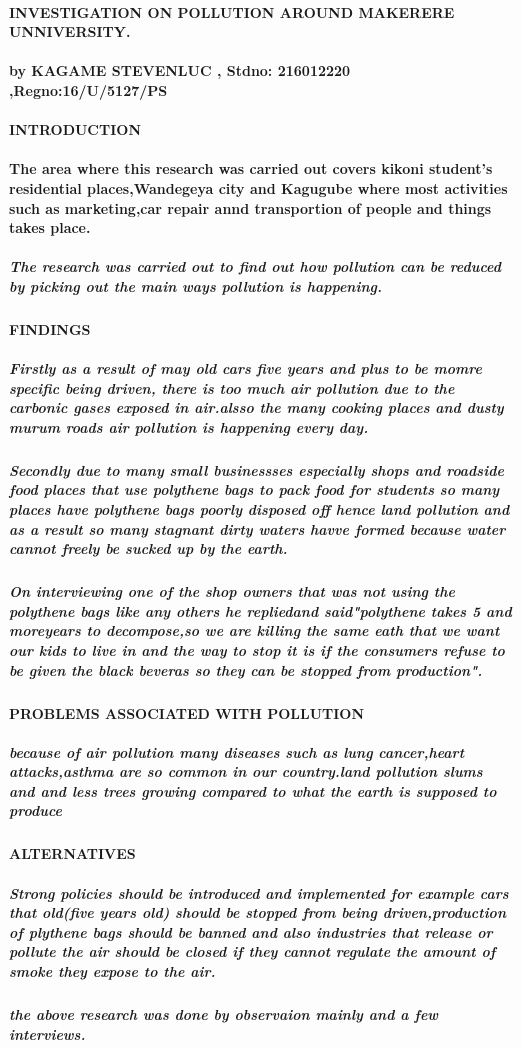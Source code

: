 \documentclass[10pt]{article}
\begin{document}
 \paragraph{ INVESTIGATION ON POLLUTION AROUND MAKERERE UNNIVERSITY. }
\paragraph{by KAGAME STEVENLUC , Stdno: 216012220 ,Regno:16/U/5127/PS}
\paragraph{INTRODUCTION}

\paragraph{The area where this research was carried out covers kikoni student's residential places,Wandegeya city and Kagugube where most activities such as marketing,car repair annd transportion of people and things takes place.}\subparagraph{The research was carried out to find out how pollution can be reduced by picking out the main ways pollution is happening.}
\paragraph{FINDINGS}
\subparagraph{Firstly as a result of may old cars five years and plus to be momre specific being driven, there is too much air pollution due to the carbonic gases exposed in air.alsso the many cooking places and dusty murum roads air pollution is happening every day.}
\subparagraph{Secondly due to many small businessses especially shops and roadside food places that use polythene bags to pack food for students so many places have polythene bags poorly disposed off hence land pollution and as a result so many stagnant dirty waters havve formed because  water cannot freely be sucked up by the earth. }
\subparagraph{On interviewing one of the shop owners that was not using the polythene bags like any others he repliedand said"polythene takes 5 and moreyears to decompose,so we are killing the same eath that we want our kids to live in and the way to stop it is if the consumers refuse to be given the black beveras so they can be stopped from production". }
\paragraph{PROBLEMS ASSOCIATED WITH POLLUTION }
\subparagraph{because of air pollution many diseases such as lung cancer,heart attacks,asthma are so common in our country.land pollution slums and and less trees growing compared to what the earth is supposed to produce}
\paragraph{ALTERNATIVES} \subparagraph{Strong policies should be introduced and implemented for example cars that old(five years old) should be stopped from being driven,production of plythene bags should be banned and also industries that release or pollute the air should be closed if they cannot regulate the amount of smoke they expose to the air.}
\subparagraph{the above research was done by observaion mainly and a few interviews.}
\end{document}
